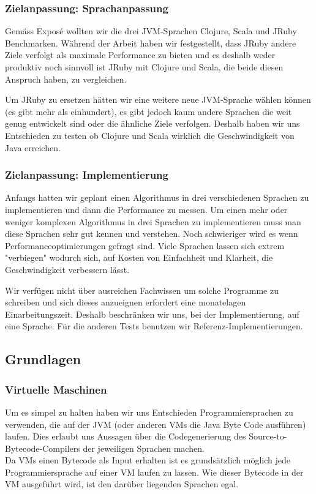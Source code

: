 \documentclass{fancydocument}
\begin{document}
\subsubsection{Zielanpassung: Sprachanpassung}

Gemäss Exposé wollten wir die drei JVM-Sprachen Clojure, Scala und JRuby
Benchmarken. W\"ahrend der Arbeit haben wir
festgestellt, dass JRuby andere Ziele verfolgt als maximale
Performance zu bieten und es deshalb weder produktiv noch sinnvoll ist
JRuby mit Clojure und Scala, die beide diesen Anspruch haben, zu
vergleichen.

Um JRuby zu ersetzen h\"atten wir eine weitere neue JVM-Sprache
wählen k\"onnen (es gibt mehr als einhundert), es gibt jedoch kaum andere
Sprachen die weit genug entwickelt sind oder die \"ahnliche Ziele
verfolgen. Deshalb haben wir uns Entschieden zu testen ob
Clojure und Scala wirklich die Geschwindigkeit von Java erreichen.

\subsubsection{Zielanpassung: Implementierung}

Anfangs hatten wir geplant einen Algorithmus in drei verschiedenen Sprachen zu
implementieren und dann die Performance zu messen. Um einen mehr oder
weniger komplexen Algorithmus in drei Sprachen zu implementieren muss
man diese Sprachen sehr gut kennen und verstehen. Noch schwieriger
wird es wenn Performanceoptimierungen gefragt sind. Viele
Sprachen lassen sich extrem "verbiegen"  wodurch sich, auf Kosten von
Einfachheit und Klarheit, die Geschwindigkeit verbessern lässt.

Wir verfügen nicht über ausreichen Fachwissen um solche Programme zu schreiben und sich dieses
anzueignen erfordert eine monatelagen Einarbeitungszeit. Deshalb
beschr\"anken wir uns, bei der Implementierung, auf eine Sprache. Für
die anderen Tests benutzen wir Referenz-Implementierungen.

\subsection{Grundlagen}

\subsubsection{Virtuelle Maschinen}

Um es simpel zu halten haben wir uns Entschieden
Programmiersprachen zu verwenden, die auf der JVM (oder anderen VMs die
Java Byte Code ausf\"uhren) laufen. Dies erlaubt uns Aussagen \"uber die
Codegenerierung des Source-to-Bytecode-Compilers der jeweiligen Sprachen
machen.
\\
Da VMs einen Bytecode als Input erhalten ist es grunds\"atzlich m\"oglich
jede Programmiersprache auf einer VM laufen zu lassen. Wie dieser
Bytecode in der VM ausgef\"uhrt wird, ist den dar\"uber liegenden Sprachen
egal.\\ 
\end{document}
